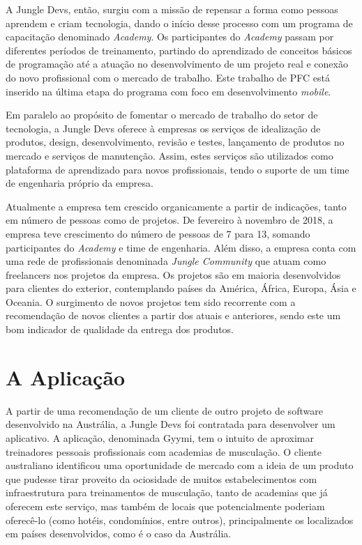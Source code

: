 A Jungle Devs, então, surgiu com a missão de repensar a forma como pessoas aprendem e criam tecnologia, dando o início desse processo com um programa de capacitação denominado \textit{Academy}. Os participantes do \textit{Academy} passam por diferentes períodos de treinamento, partindo do aprendizado de conceitos básicos de programação até a atuação no desenvolvimento de um projeto real e conexão do novo profissional com o mercado de trabalho. Este trabalho de PFC está inserido na última etapa do programa com foco em desenvolvimento \textit{mobile}.

Em paralelo ao propósito de fomentar o mercado de trabalho do setor de tecnologia, a Jungle Devs oferece à empresas os serviços de idealização de produtos, design, desenvolvimento, revisão e testes, lançamento de produtos no mercado e serviços de manutenção. Assim, estes serviços são utilizados como plataforma de aprendizado para novos profissionais, tendo o suporte de um time de engenharia próprio da empresa.

Atualmente a empresa tem crescido organicamente a partir de indicações, tanto em número de pessoas como de projetos. De fevereiro à novembro de 2018, a empresa teve crescimento do número de pessoas de 7 para 13, somando participantes do \textit{Academy} e time de engenharia. Além disso, a empresa conta com uma rede de profissionais denominada \textit{Jungle Community} que atuam como freelancers nos projetos da empresa. Os projetos são em maioria desenvolvidos para clientes do exterior, contemplando países da América, África, Europa, Ásia e Oceania. O surgimento de novos projetos tem sido recorrente com a recomendação de novos clientes a partir dos atuais e anteriores, sendo este um bom indicador de qualidade da entrega dos produtos.

\section{A Aplicação}
A partir de uma recomendação de um cliente de outro projeto de software desenvolvido na Austrália, a Jungle Devs foi contratada para desenvolver um aplicativo. A aplicação, denominada Gyymi, tem o intuito de aproximar treinadores pessoais profissionais com academias de musculação. O cliente australiano identificou uma oportunidade de mercado com a ideia de um produto que pudesse tirar proveito da ociosidade de muitos estabelecimentos com infraestrutura para treinamentos de musculação, tanto de academias que já oferecem este serviço, mas também de locais que potencialmente poderiam oferecê-lo (como hotéis, condomínios, entre outros), principalmente os localizados em países desenvolvidos, como é o caso da Austrália.

